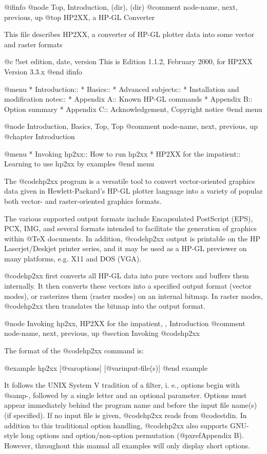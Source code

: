 @ifinfo
@node Top, Introduction, (dir), (dir)
@comment  node-name,  next,  previous,  up
@top HP2XX, a HP-GL Converter

This file describes HP2XX, a converter of HP-GL plotter data into
some vector and raster formats

@c !!set edition, date, version
This is Edition 1.1.2, February 2000, for HP2XX Version 3.3.x
@end ifinfo


@menu
* Introduction::
* Basics::
* Advanced subjects::
* Installation and modification notes::
* Appendix A::                          Known HP-GL commands
* Appendix B::                          Option summary
* Appendix C::                          Acknowledgement, Copyright notice
@end menu

@node Introduction, Basics, Top, Top
@comment  node-name,  next,  previous,  up
@chapter Introduction

@menu
* Invoking hp2xx::          How to run hp2xx
* HP2XX for the impatient:: Learning to use hp2xx by examples
@end menu

The @code{hp2xx} program is a versatile tool to convert vector-oriented
graphics data given in Hewlett-Packard's HP-GL plotter language
into a variety of popular both vector- and raster-oriented graphics formats.

The various supported output formats include Encapsulated PostScript (EPS),
PCX, IMG, and several formats intended to facilitate the generation of
graphics within @TeX{} documents.
In addition, @code{hp2xx} output is printable on the HP Laserjet/Deskjet
printer series, and it may be used as a HP-GL previewer on many
platforms, e.g. X11 and DOS (VGA).

@code{hp2xx} first converts all HP-GL data into pure vectors and buffers
them internally. It then converts these vectors into a specified output
format (vector modes), or rasterizes them (raster modes) on an internal
bitmap. In raster modes, @code{hp2xx} then translates the bitmap into the
output format.



@node Invoking hp2xx, HP2XX for the impatient, , Introduction
@comment  node-name,  next,  previous,  up
@section Invoking @code{hp2xx}

The format of the @code{hp2xx} command is:

@example
hp2xx [@var{options}] [@var{input-file(s)}]
@end example

It follows the UNIX System V tradition of a filter, i. e., options begin
with @samp{-}, followed by a single letter and an optional parameter.
Options must appear immediately behind the program name and before the input
file name(s) (if specified). If no input file is given, @code{hp2xx} reads
from @code{stdin}. In addition to this traditional option handling,
@code{hp2xx} also supports GNU-style long options and option/non-option
permutation (@pxref{Appendix B}). However, throughout this manual
all examples will only display short options.

